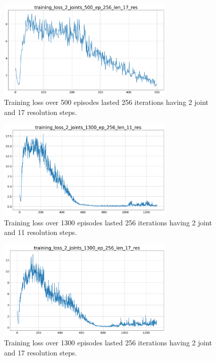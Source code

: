 \documentclass[twocolumn, a4paper]{article}
\begin{document}
\begin{figure}[H]
	\centering
	\includegraphics[width=8.5cm]{"../Figures/training_loss_2J_500E_256EL_17RES.png"}
	\caption{Training loss over 500 episodes lasted 256 iterations having 2
			 joint and 17 resolution steps.}
	\label{fig:TrainLoss_2_500_17}
\end{figure}
\vspace{-1cm}

\begin{figure}[H]
	\centering
	\includegraphics[width=8.5cm]{"../Figures/training_loss_2J_1300E_256EL_11RES.png"}
	\caption{Training loss over 1300 episodes lasted 256 iterations having 2
			 joint and 11 resolution steps.}
	\label{fig:TrainLoss_2_1300_11}
\end{figure}

\begin{figure}[H]
	\centering
	\includegraphics[width=8.5cm]{"../Figures/training_loss_2J_1300E_256EL_17RES.png"}
	\caption{Training loss over 1300 episodes lasted 256 iterations having 2
			 joint and 17 resolution steps.}
	\label{fig:TrainLoss_2_1300_17}
\end{figure}
\end{document}
